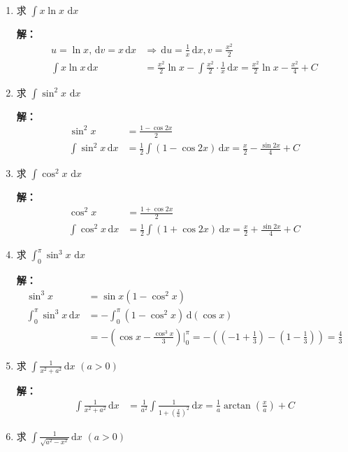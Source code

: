 \documentclass[12pt,a4paper]{article}
\newcommand{\dd}{\,\mathrm{d}}
\begin{document}
\begin{enumerate}[label=\textbf{\arabic*.}, leftmargin=*, itemsep=1.2em]
\item 求 $\displaystyle \int x \ln x \, \dd x$

\textbf{解：}
\begin{align*}
u=\ln x, \dd v=x \dd x &\Rightarrow \dd u=\frac{1}{x}\dd x, v=\frac{x^2}{2} \\
\int x \ln x \dd x &= \frac{x^2}{2}\ln x - \int \frac{x^2}{2} \cdot \frac{1}{x} \dd x = \frac{x^2}{2}\ln x - \frac{x^2}{4} + C
\end{align*}

\item 求 $\displaystyle \int \sin^2 x \, \dd x$

\textbf{解：}
\begin{align*}
\sin^2 x &= \frac{1-\cos 2x}{2} \\
\int \sin^2 x \dd x &= \frac{1}{2} \int (1-\cos 2x) \dd x = \frac{x}{2} - \frac{\sin 2x}{4} + C
\end{align*}

\item 求 $\displaystyle \int \cos^2 x \, \dd x$

\textbf{解：}
\begin{align*}
\cos^2 x &= \frac{1+\cos 2x}{2} \\
\int \cos^2 x \dd x &= \frac{1}{2} \int (1+\cos 2x) \dd x = \frac{x}{2} + \frac{\sin 2x}{4} + C
\end{align*}

\item 求 $\displaystyle \int_0^{\pi} \sin^3 x \, \dd x$

\textbf{解：}
\begin{align*}
\sin^3 x &= \sin x (1-\cos^2 x) \\
\int_0^{\pi} \sin^3 x \dd x &= -\int_0^{\pi} (1-\cos^2 x) \dd(\cos x) \\
&= -\left( \cos x - \frac{\cos^3 x}{3} \right) \bigg|_0^{\pi} = -\left( (-1 + \frac{1}{3}) - (1 - \frac{1}{3}) \right) = \frac{4}{3}
\end{align*}

\item 求 $\displaystyle \int \frac{1}{x^2 + a^2} \dd x$ $(a>0)$

\textbf{解：}
\begin{align*}
\int \frac{1}{x^2 + a^2} \dd x &= \frac{1}{a^2} \int \frac{1}{1 + \left( \frac{x}{a} \right)^2} \dd x = \frac{1}{a} \arctan\left( \frac{x}{a} \right) + C
\end{align*}

\item 求 $\displaystyle \int \frac{1}{\sqrt{a^2 - x^2}} \dd x$ $(a>0)$


\end{enumerate}
\end{document}
